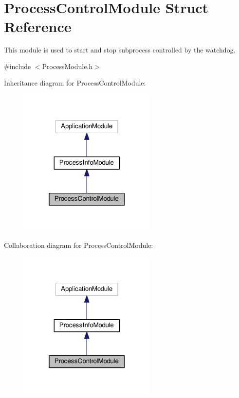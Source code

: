 \hypertarget{structProcessControlModule}{}\section{Process\+Control\+Module Struct Reference}
\label{structProcessControlModule}


This module is used to start and stop subprocess controlled by the watchdog.  




{\ttfamily \#include $<$Process\+Module.\+h$>$}



Inheritance diagram for Process\+Control\+Module\+:
\nopagebreak
\begin{figure}[H]
\begin{center}
\leavevmode
\includegraphics[width=196pt]{structProcessControlModule__inherit__graph}
\end{center}
\end{figure}


Collaboration diagram for Process\+Control\+Module\+:
\nopagebreak
\begin{figure}[H]
\begin{center}
\leavevmode
\includegraphics[width=196pt]{structProcessControlModule__coll__graph}
\end{center}
\end{figure}
